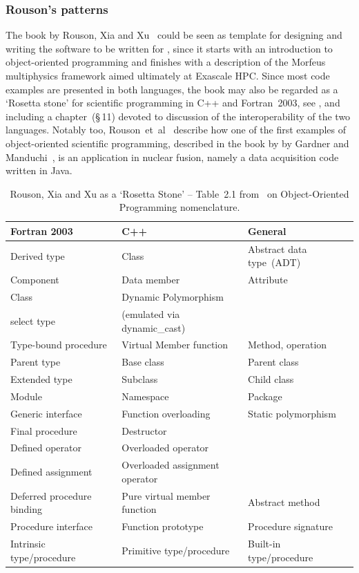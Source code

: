 \subsubsection{Rouson's patterns}\label{sec:rouson}
The book by Rouson, Xia and Xu~\cite{rousonxiaxu} could be seen as template for designing and writing the
software to be written for \nep, since it starts with an introduction to object-oriented programming
and finishes with a description of the Morfeus multiphysics framework aimed ultimately at Exascale HPC.
Since most code examples are presented in both languages, the book may also be regarded as a `Rosetta stone'
for scientific programming in C++ and Fortran~2003, see , and including
a chapter~(\S\,11) devoted to discussion of the interoperability of the two languages.
Notably too, Rouson~et~al~\cite[\S,4.2.3]{rousonxiaxu} describe how one of the first examples of object-oriented
scientific programming, described in the book by by Gardner and Manduchi~\cite{gardnermanduchi},
is an application in nuclear fusion, namely a data acquisition code written in Java.

\begin{table}[h]
\begin{center}
\caption{Rouson, Xia and Xu as a `Rosetta Stone' -- Table~2.1 from~\cite{rousonxiaxu} 
on Object-Oriented Programming nomenclature.\label{tab:oopnomen}}
\begin{tabular}{|p{5cm}|p{5cm}|p{5cm}|}
\hline
Fortran 2003 & C++ & General \\
\hline
Derived type & Class & Abstract data type~(ADT) \\
Component & Data member & Attribute \\
Class & Dynamic Polymorphism & \\
select type & (emulated via dynamic\_cast) &\\
Type-bound procedure & Virtual Member function & Method, operation \\
Parent type & Base class & Parent class \\
Extended type & Subclass & Child class \\
Module & Namespace & Package \\
Generic interface & Function overloading & Static polymorphism \\
Final procedure & Destructor &\\
Defined operator & Overloaded operator & \\
Defined assignment & Overloaded assignment operator & \\
Deferred procedure binding & Pure virtual member function & Abstract method \\
Procedure interface & Function prototype & Procedure signature \\
Intrinsic type/procedure & Primitive type/procedure & Built-in type/procedure \\
\hline
\end{tabular}
\end{center}
\end{table}

